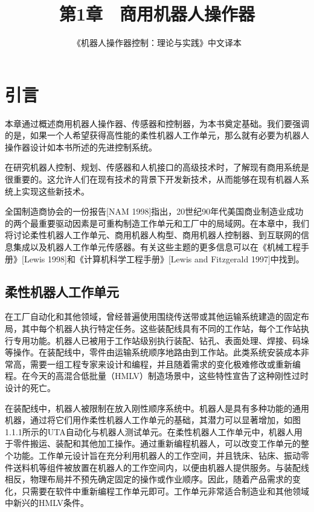 \documentclass[UTF8,a4paper]{ctexart}
\title{第1章　商用机器人操作器}
\author{《机器人操作器控制：理论与实践》中文译本}
\date{}
\begin{document}
  \maketitle
\fi

\section{引言}

本章通过概述商用机器人操作器、传感器和控制器，为本书奠定基础。我们要强调的是，如果一个人希望获得高性能的柔性机器人工作单元，那么就有必要为机器人操作器设计如本书所述的先进控制系统。

在研究机器人控制、规划、传感器和人机接口的高级技术时，了解现有商用系统是很重要的。这允许人们在现有技术的背景下开发新技术，从而能够在现有机器人系统上实现这些新技术。

全国制造商协会的一份报告[NAM 1998]指出，20世纪90年代美国商业制造业成功的两个最重要驱动因素是可重构制造工作单元和工厂中的局域网。在本章中，我们将讨论柔性机器人工作单元、商用机器人构型、商用机器人控制器、到互联网的信息集成以及机器人工作单元传感器。有关这些主题的更多信息可以在《机械工程手册》[Lewis 1998]和《计算机科学工程手册》[Lewis and Fitzgerald 1997]中找到。

\subsection{柔性机器人工作单元}

在工厂自动化和其他领域，曾经普遍使用围绕传送带或其他运输系统建造的固定布局，其中每个机器人执行特定任务。这些装配线具有不同的工作站，每个工作站执行专用功能。机器人已被用于工作站级别执行装配、钻孔、表面处理、焊接、码垛等操作。在装配线中，零件由运输系统顺序地路由到工作站。此类系统安装成本非常高，需要一组工程专家来设计和编程，并且随着需求的变化极难修改或重新编程。在今天的高混合低批量（HMLV）制造场景中，这些特性宣告了这种刚性过时设计的死亡。

在装配线中，机器人被限制在放入刚性顺序系统中。机器人是具有多种功能的通用机器，通过将它们用作柔性机器人工作单元的基础，其潜力可以显著增加，如图1.1.1所示的UTA自动化与机器人测试单元。在柔性机器人工作单元中，机器人用于零件搬运、装配和其他加工操作。通过重新编程机器人，可以改变工作单元的整个功能。工作单元设计旨在充分利用机器人的工作空间，并且铣床、钻床、振动零件送料机等组件被放置在机器人的工作空间内，以便由机器人提供服务。与装配线相反，物理布局并不预先确定固定的操作或作业顺序。因此，随着产品需求的变化，只需要在软件中重新编程工作单元即可。工作单元非常适合制造业和其他领域中新兴的HMLV条件。
\end{document}
